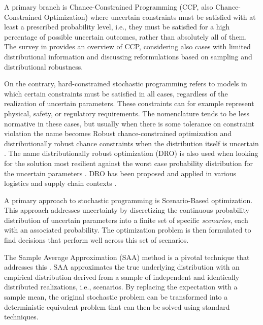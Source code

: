 \documentclass[opre,sglanonrev,11pt]{informs4}
\begin{document}
A primary branch is Chance-Constrained Programming (CCP, also Chance-Constrained Optimization) \cite{CC59,P95} where uncertain constraints must be satisfied with at least a prescribed probability level, i.e., they must be satisfied for a high percentage of possible uncertain outcomes, rather than absolutely all of them. The survey in \cite{KJ22} provides an overview of CCP, considering also cases with limited distributional information and discussing reformulations based on sampling and distributional robustness.

On the contrary, hard-constrained stochastic programming \cite{BL11,SDR09} refers to models in which certain constraints must be satisfied in all cases, regardless of the realization of uncertain parameters. These constraints can for example represent physical, safety, or regulatory requirements. The nomenclature tends to be less normative in these cases, but usually when there is some tolerance on constraint violation the name becomes Robust chance-constrained optimization \cite{RM22} and distributionally robust chance constraints when the distribution itself is uncertain \cite{DY10,RM22}. The name distributionally robust optimization (DRO) is also used when looking for the solution most resilient against the worst case probability distribution for the uncertain parameters \cite{DY10}. DRO has been proposed and applied in various logistics and supply chain contexts \cite{WC20,JWCZ22}.

A primary approach to stochastic programming is Scenario-Based optimization. This approach addresses uncertainty by discretizing the continuous probability distribution of uncertain parameters into a finite set of specific {\it scenarios}, each with an associated probability. The optimization problem is then formulated to find decisions that perform well across this set of scenarios.

The Sample Average Approximation (SAA) method is a pivotal technique that addresses this \cite{SH98}. SAA approximates the true underlying distribution with an empirical distribution derived from a sample of independent and identically distributed realizations, i.e., scenarios. By replacing the expectation with a sample mean, the original stochastic problem can be transformed into a deterministic equivalent problem that can then be solved using standard techniques.
\end{document}
